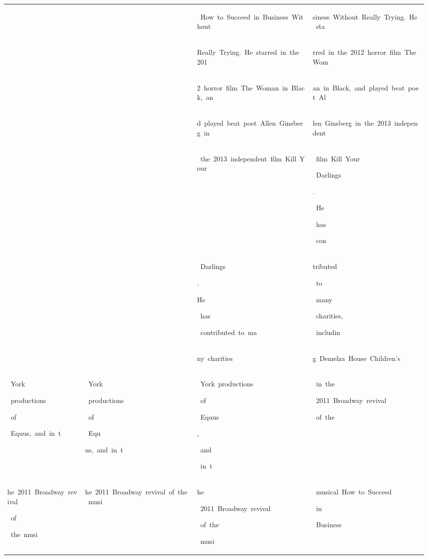 \begin{table}[h]
\begin{tabular}{ l l l l }
  &  & \colorbox{cm_63!40}{\strut \ How\ to\ Succeed\ in\ Business\ Without\ } & \colorbox{cm_63!40}{\strut siness\ Without\ Really\ Trying.\ He\ sta} \\ 
  &  & \colorbox{cm_63!40}{\strut Really\ Trying.\ He\ starred\ in\ the\ 201} & \colorbox{cm_63!40}{\strut rred\ in\ the\ 2012\ horror\ film\ The\ Wom} \\ 
  &  & \colorbox{cm_63!40}{\strut 2\ horror\ film\ The\ Woman\ in\ Black,\ an} & \colorbox{cm_63!40}{\strut an\ in\ Black,\ and\ played\ beat\ poet\ Al} \\ 
  &  & \colorbox{cm_63!40}{\strut d\ played\ beat\ poet\ Allen\ Ginsberg\ in} & \colorbox{cm_63!40}{\strut len\ Ginsberg\ in\ the\ 2013\ independent} \\ 
  &  & \colorbox{cm_63!40}{\strut \ the\ 2013\ independent\ film\ Kill\ Your} & \colorbox{cm_63!40}{\strut \ film\ Kill\ Your}\colorbox{cm_0!40}{\strut \ Darlings}\colorbox{cm_12!40}{\strut .}\colorbox{cm_25!40}{\strut \ He}\colorbox{cm_12!40}{\strut \ has}\colorbox{cm_25!40}{\strut \ con} \\ 
  &  & \colorbox{cm_0!40}{\strut \ Darlings}\colorbox{cm_12!40}{\strut .}\colorbox{cm_25!40}{\strut }\colorbox{cm_38!40}{\strut He}\colorbox{cm_51!40}{\strut \ has}\colorbox{cm_63!40}{\strut \ contributed\ to\ ma} & \colorbox{cm_25!40}{\strut tributed}\colorbox{cm_38!40}{\strut \ to}\colorbox{cm_51!40}{\strut \ many}\colorbox{cm_63!40}{\strut \ charities,}\colorbox{cm_0!40}{\strut \ includin} \\ 
  &  & \colorbox{cm_63!40}{\strut ny\ charities} & \colorbox{cm_0!40}{\strut g\ Demelza\ House\ Children's} \\ 
  \midrule \colorbox{cm_33!40}{\strut \ York}\colorbox{cm_63!40}{\strut \ productions}\colorbox{cm_34!40}{\strut \ of}\colorbox{cm_63!40}{\strut \ Equus,\ and\ in\ t} & \colorbox{cm_12!40}{\strut \ York}\colorbox{cm_25!40}{\strut \ productions}\colorbox{cm_38!40}{\strut \ of}\colorbox{cm_51!40}{\strut \ Equ}\colorbox{cm_63!40}{\strut us,\ and\ in\ t} & \colorbox{cm_0!40}{\strut \ York\ productions}\colorbox{cm_12!40}{\strut \ of}\colorbox{cm_0!40}{\strut \ Equus}\colorbox{cm_12!40}{\strut ,}\colorbox{cm_25!40}{\strut \ and}\colorbox{cm_12!40}{\strut \ in\ t} & \colorbox{cm_12!40}{\strut \ in\ the}\colorbox{cm_0!40}{\strut \ 2011\ Broadway\ revival}\colorbox{cm_12!40}{\strut \ of\ the} \\ 
 \colorbox{cm_63!40}{\strut he\ 2011\ Broadway\ revival}\colorbox{cm_34!40}{\strut \ of}\colorbox{cm_63!40}{\strut \ the\ musi} & \colorbox{cm_63!40}{\strut he\ 2011\ Broadway\ revival\ of\ the\ musi} & \colorbox{cm_12!40}{\strut he}\colorbox{cm_0!40}{\strut \ 2011\ Broadway\ revival}\colorbox{cm_12!40}{\strut \ of\ the}\colorbox{cm_0!40}{\strut \ musi} & \colorbox{cm_0!40}{\strut \ musical\ How\ to\ Succeed}\colorbox{cm_12!40}{\strut \ in}\colorbox{cm_0!40}{\strut \ Business\ } \\ 

\end{tabular}
\end{table}
